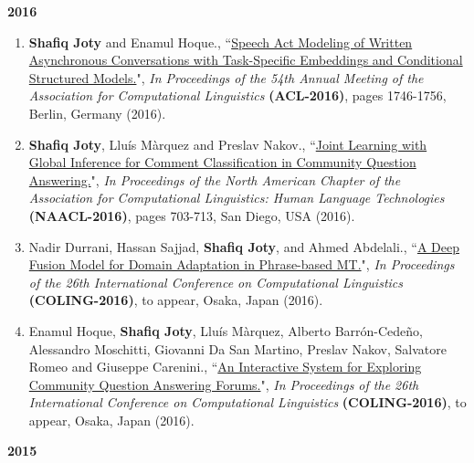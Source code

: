 \documentclass[paper=letter,fontsize=11pt]{scrartcl} %
\newcommand{\PaperEntry}[7]{
		\noindent #1, ``\href{#7}{#2}", \textit{#3} \textbf{#4}, #5 (#6).}
\begin{document}
\Large \textbf{2016} \normalsize

\begin{enumerate}


\item \PaperEntry{\textbf{Shafiq Joty} and Enamul Hoque.}{Speech Act Modeling of Written Asynchronous Conversations with Task-Specific Embeddings and Conditional Structured Models.}{In Proceedings of the 54th Annual Meeting of the Association for Computational Linguistics} {(ACL-2016)}{pages 1746-1756, Berlin, Germany}{2016}
{https://www.aclweb.org/anthology/P/P16/P16-1165.pdf}

\item \PaperEntry{\textbf{Shafiq Joty}, Lluís Màrquez and Preslav Nakov.}{Joint Learning with Global Inference for Comment Classification in Community Question Answering.}{In Proceedings of the North American Chapter of the Association for Computational Linguistics: Human Language Technologies} {(NAACL-2016)}{pages 703-713, San Diego, USA}{2016}
{http://m-mitchell.com/NAACL-2016/NAACL-HLT2016/pdf/N16-1084.pdf}

\item \PaperEntry{Nadir Durrani, Hassan Sajjad, \textbf{Shafiq Joty}, and Ahmed Abdelali.}{A Deep Fusion Model for Domain Adaptation in Phrase-based MT.}{In Proceedings of the 26th International Conference on Computational Linguistics} {(COLING-2016)}{to appear, Osaka, Japan}{2016}
{http://coling2016.anlp.jp/}

\item \PaperEntry{Enamul Hoque, \textbf{Shafiq Joty}, Lluís Màrquez, Alberto Barrón-Cedeño, Alessandro Moschitti, Giovanni Da San Martino, Preslav Nakov, Salvatore Romeo and Giuseppe Carenini.}{An Interactive System for Exploring Community Question Answering Forums.}{In Proceedings of the 26th International Conference on Computational Linguistics} {(COLING-2016)}{to appear, Osaka, Japan}{2016}
{http://coling2016.anlp.jp/}

\end{enumerate}

\Large \textbf{2015} \normalsize
\end{document}

